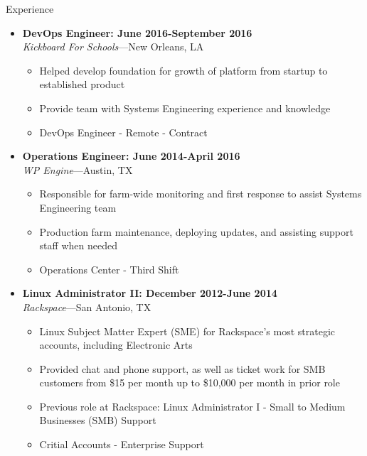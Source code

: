 \documentclass[10pt,oneside]{article}
\newenvironment{ressection}[1]{
    \vspace{4pt}
    {\fontfamily{phv}\selectfont\Large#1}
    \begin{itemize}
    \vspace{3pt}
}{
    \end{itemize}
}
\newcommand{\ressubitem}[1]{
    \vspace{-1pt}
    \item \begin{flushleft} #1 \end{flushleft}
}
\newcommand{\resbigitem}[3]{
    \vspace{-5pt}
    \item
    \textbf{#3} \\
    \textit{#1}---#2
}
\newenvironment{ressubsec}[3]{
    \resbigitem{#1}{#2}{#3}
    \vspace{-2pt}
    \begin{itemize}
}{
    \end{itemize}
}
\begin{document}
\begin{ressection}{Experience}
    \begin{ressubsec}{Kickboard For Schools}{New Orleans, LA}{DevOps Engineer: June 2016-September 2016}
        \ressubitem{Helped develop foundation for growth of platform from startup to established product}
        \ressubitem{Provide team with Systems Engineering experience and knowledge}
        \ressubitem{DevOps Engineer - Remote - Contract}
    \end{ressubsec}

    \begin{ressubsec}{WP Engine}{Austin, TX}{Operations Engineer: June 2014-April 2016}
        \ressubitem{Responsible for farm-wide monitoring and first response to assist Systems Engineering team}
        \ressubitem{Production farm maintenance, deploying updates, and assisting support staff when needed}
        \ressubitem{Operations Center - Third Shift}
    \end{ressubsec}

    \pagebreak

    \begin{ressubsec}{Rackspace}{San Antonio, TX}{Linux Administrator II: December 2012-June 2014}
        \ressubitem{Linux Subject Matter Expert (SME) for Rackspace's most strategic accounts, including Electronic Arts}
        \ressubitem{Provided chat and phone support, as well as ticket work for SMB customers from \$15 per month up to \$10,000 per month in prior role}
        \ressubitem{Previous role at Rackspace: Linux Administrator I - Small to Medium Businesses (SMB) Support}
        \ressubitem{Critial Accounts - Enterprise Support}
    \end{ressubsec}

\end{ressection}
\end{document}
